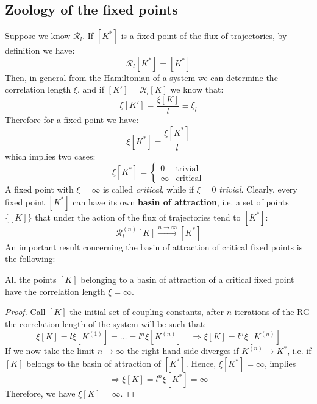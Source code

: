 \documentclass[../main/main.tex]{subfiles}
\begin{document}
 \subsection{Zoology of the fixed points}
 Suppose we know \( \mathcal{R}_{l} \). If \( [K^*] \) is a fixed point of the flux of trajectories, by definition we have:
 \begin{equation}
    \mathcal{R}_l [K^*] = [K^*]
 \end{equation}
 Then, in general from the Hamiltonian of a system we can determine the correlation length \( \xi  \), and if \( [K'] = \mathcal{R}_l [K] \)  we know that:
\begin{equation*}
  \xi [K'] = \frac{\xi [K]}{l} \equiv \xi _l
\end{equation*}
Therefore for a fixed point we have:
\begin{equation}
  \xi [K^*] = \frac{\xi [K^*]}{l}
\end{equation}
which implies two cases:
\begin{equation}
  \xi [K^*] =
  \begin{cases}
   0 & \text{trivial}\\
   \infty & \text{critical}
  \end{cases}
\end{equation}
A fixed point with \( \xi = \infty  \) is called \emph{critical}, while if \( \xi =0 \) \emph{trivial}. Clearly, every fixed point \( [K^*] \)  can have its own \textbf{basin of attraction}, i.e. a set of points \( \{ [K] \}   \) that under the action of the flux of trajectories tend to \( [K^*] \):
\begin{equation}
  \mathcal{R}_l^{(n)} [K] \overset{n \rightarrow \infty }{\longrightarrow} [K^*]
\end{equation}
An important result concerning the basin of attraction of critical fixed points is the following:


\begin{theorem}{}{}
All the points \([K]  \) belonging to a basin of attraction of a critical fixed point have the correlation length \( \xi = \infty  \).
\end{theorem}
\begin{proof}
  Call \( [K] \) the initial set of coupling constants, after \( n \)  iterations of the RG the correlation length of the system will be such that:
\begin{equation*}
  \xi [K] = l \xi [K^{(1)}] = \dots =l^n \xi [ K^{(n)}] \quad \Rightarrow \xi [K] = l^n \xi [ K^{(n)}]
\end{equation*}
If we now take the limit \( n \rightarrow \infty  \)  the right hand side diverges if \( K^{(n)} \rightarrow K^* \), i.e. if \( [K] \)  belongs to the basin of attraction of \( [K^*] \).
Hence, \( \xi [K^*] = \infty  \), implies
\begin{equation*}
  \Rightarrow \xi [K] = l^n \xi [K^*] = \infty
\end{equation*}
Therefore, we have \( \xi [K] = \infty  \).

\end{proof}
\end{document}

